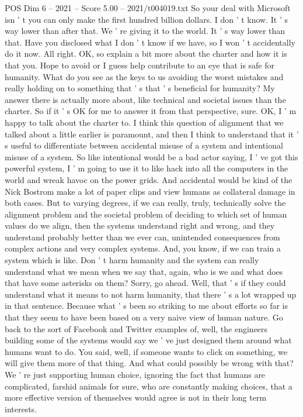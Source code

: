 \begin{textsample}{POS Dim 6 – 2021 – Score 5.00 – 2021/t004019.txt}
So your deal with Microsoft isn ' t you can only make the first hundred billion dollars.
I don ' t know.
It ' s way lower than after that.
We ' re giving it to the world.
It ' s way lower than that.
Have you disclosed what I don ' t know if we have, so I won ' t accidentally do it now.
All right.
OK, so explain a bit more about the charter and how it is that you.
Hope to avoid or I guess help contribute to an eye that is safe for humanity.
What do you see as the keys to us avoiding the worst mistakes and really holding on to something that ' s that ' s beneficial for humanity?
My answer there is actually more about, like technical and societal issues than the charter.
So if it ' s OK for me to answer it from that perspective, sure.
OK, I ' m happy to talk about the charter to.
I think this question of alignment that we talked about a little earlier is paramount, and then I think to understand that it ' s useful to differentiate between accidental misuse of a system and intentional misuse of a system.
So like intentional would be a bad actor saying, I ' ve got this powerful system, I ' m going to use it to like hack into all the computers in the world and wreak havoc on the power grids.
And accidental would be kind of the Nick Bostrom make a lot of paper clips and view humans as collateral damage in both cases.
But to varying degrees, if we can really, truly, technically solve the alignment problem and the societal problem of deciding to which set of human values do we align, then the systems understand right and wrong, and they understand probably better than we ever can, unintended consequences from complex actions and very complex systems.
And, you know, if we can train a system which is like.
Don ' t harm humanity and the system can really understand what we mean when we say that, again, who is we and what does that have some asterisks on them?
Sorry, go ahead.
Well, that ' s if they could understand what it means to not harm humanity, that there ' s a lot wrapped up in that sentence.
Because what ' s been so striking to me about efforts so far is that they seem to have been based on a very naive view of human nature.
Go back to the sort of Facebook and Twitter examples of, well, the engineers building some of the systems would say we ' ve just designed them around what humans want to do.
You said, well, if someone wants to click on something, we will give them more of that thing.
And what could possibly be wrong with that?
We ' re just supporting human choice, ignoring the fact that humans are complicated, farshid animals for sure, who are constantly making choices, that a more effective version of themselves would agree is not in their long term interests.

\end{textsample}
